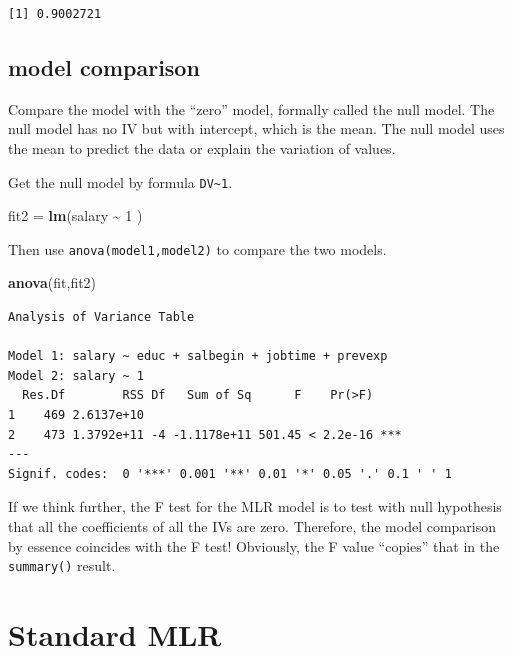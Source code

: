 \documentclass[
]{ctexart}
\newenvironment{Shaded}{\begin{snugshade}}{\end{snugshade}}
\newcommand{\DecValTok}[1]{\textcolor[rgb]{0.00,0.00,0.81}{#1}}
\newcommand{\FunctionTok}[1]{\textcolor[rgb]{0.13,0.29,0.53}{\textbf{#1}}}
\newcommand{\NormalTok}[1]{#1}
\newcommand{\OtherTok}[1]{\textcolor[rgb]{0.56,0.35,0.01}{#1}}
\newcommand{\SpecialCharTok}[1]{\textcolor[rgb]{0.81,0.36,0.00}{\textbf{#1}}}
\begin{document}
\begin{verbatim}
[1] 0.9002721
\end{verbatim}

\hypertarget{model-comparison}{%
\subsection{model comparison}\label{model-comparison}}

Compare the model with the ``zero'' model, formally called the null
model. The null model has no IV but with intercept, which is the mean.
The null model uses the mean to predict the data or explain the
variation of values.

Get the null model by formula \texttt{DV\textasciitilde{}1}.

\begin{Shaded}
\begin{Highlighting}[]
\NormalTok{fit2 }\OtherTok{=} \FunctionTok{lm}\NormalTok{(salary }\SpecialCharTok{\textasciitilde{}} \DecValTok{1}\NormalTok{ )}
\end{Highlighting}
\end{Shaded}

Then use \texttt{anova(model1,model2)} to compare the two models.

\begin{Shaded}
\begin{Highlighting}[]
\FunctionTok{anova}\NormalTok{(fit,fit2)}
\end{Highlighting}
\end{Shaded}

\begin{verbatim}
Analysis of Variance Table

Model 1: salary ~ educ + salbegin + jobtime + prevexp
Model 2: salary ~ 1
  Res.Df        RSS Df   Sum of Sq      F    Pr(>F)    
1    469 2.6137e+10                                    
2    473 1.3792e+11 -4 -1.1178e+11 501.45 < 2.2e-16 ***
---
Signif. codes:  0 '***' 0.001 '**' 0.01 '*' 0.05 '.' 0.1 ' ' 1
\end{verbatim}

If we think further, the F test for the MLR model is to test with null
hypothesis that all the coefficients of all the IVs are zero. Therefore,
the model comparison by essence coincides with the F test! Obviously,
the F value ``copies'' that in the \texttt{summary()} result.

\hypertarget{standard-mlr}{%
\section{Standard MLR}\label{standard-mlr}}
\end{document}
